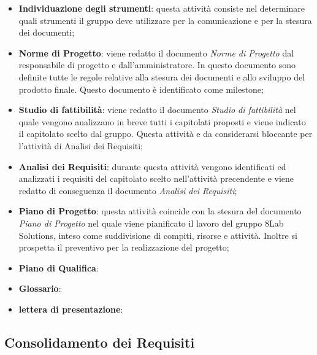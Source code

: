 \begin{itemize}
	\item \textbf{Individuazione degli strumenti}: questa attività consiste nel 
	determinare quali strumenti il gruppo deve utilizzare per la comunicazione 
	e per la stesura dei documenti; 
	\item \textbf{Norme di Progetto}: viene redatto il documento \textit{Norme 
	di Progetto} dal responsabile di progetto e dall'amministratore. In questo 
	documento sono definite tutte le regole relative alla stesura dei documenti 
	e allo sviluppo del prodotto finale. Questo documento è identificato come 
	milestone\glo; %
	\item \textbf{Studio di fattibilità}: viene redatto il documento 
	\textit{Studio di fattibilità} nel quale vengono analizzano in breve tutti 
	i capitolati proposti e viene indicato il capitolato scelto dal gruppo. 
	Questa attività e da considerarsi bloccante per l'attività di Analisi dei 
	Requisiti;
	\item \textbf{Analisi dei Requisiti}: durante questa attività vengono 
	identificati ed analizzati i requisiti del capitolato scelto nell'attività 
	precendente e viene redatto di conseguenza il documento \textit{Analisi dei 
	Requisiti};
	\item \textbf{Piano di Progetto}: questa attività coincide con la stesura 
	del documento \textit{Piano di Progetto} nel quale viene pianificato il 
	lavoro del gruppo 8Lab Solutions, inteso come suddivisione di compiti, 
	risorse e attività. Inoltre si prospetta il preventivo per la realizzazione 
	del 
	progetto;
	\item \textbf{Piano di Qualifica}: 
	\item \textbf{Glossario}: 
	
	\item \textbf{lettera di presentazione}:
\end{itemize}

\subsection{Consolidamento dei Requisiti}